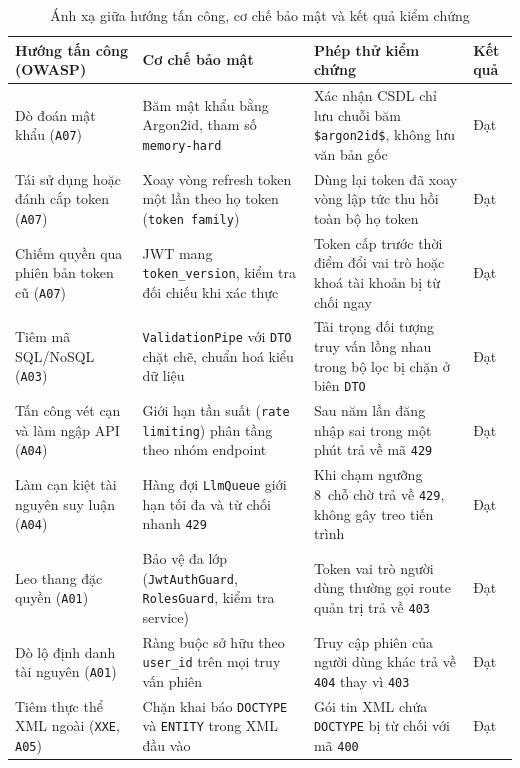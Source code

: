 \begin{table}[htbp]
\centering
\caption{Ánh xạ giữa hướng tấn công, cơ chế bảo mật và kết quả kiểm chứng}
\label{tab:anh-xa-bao-mat-owasp}
\footnotesize
\setlength{\tabcolsep}{4pt}
\begin{tabularx}{\textwidth}{
  >{\raggedright\arraybackslash}p{3.4cm}
  >{\raggedright\arraybackslash}p{4.3cm}
  >{\raggedright\arraybackslash}X
  >{\raggedright\arraybackslash}p{1.4cm}
}
\toprule
\textbf{Hướng tấn công (OWASP)} & \textbf{Cơ chế bảo mật} & \textbf{Phép thử kiểm chứng} & \textbf{Kết quả} \\
\midrule
Dò đoán mật khẩu (\texttt{A07}) & Băm mật khẩu bằng Argon2id, tham số \texttt{memory-hard} & Xác nhận CSDL chỉ lưu chuỗi băm \texttt{\$argon2id\$}, không lưu văn bản gốc & Đạt \\
\midrule
Tái sử dụng hoặc đánh cắp token (\texttt{A07}) & Xoay vòng refresh token một lần theo họ token (\texttt{token family}) & Dùng lại token đã xoay vòng lập tức thu hồi toàn bộ họ token & Đạt \\
\midrule
Chiếm quyền qua phiên bản token cũ (\texttt{A07}) & JWT mang \texttt{token\_version}, kiểm tra đối chiếu khi xác thực & Token cấp trước thời điểm đổi vai trò hoặc khoá tài khoản bị từ chối ngay & Đạt \\
\midrule
Tiêm mã SQL/NoSQL (\texttt{A03}) & \texttt{ValidationPipe} với \texttt{DTO} chặt chẽ, chuẩn hoá kiểu dữ liệu & Tải trọng đối tượng truy vấn lồng nhau trong bộ lọc bị chặn ở biên \texttt{DTO} & Đạt \\
\midrule
Tấn công vét cạn và làm ngập API (\texttt{A04}) & Giới hạn tần suất (\texttt{rate limiting}) phân tầng theo nhóm endpoint & Sau năm lần đăng nhập sai trong một phút trả về mã \texttt{429} & Đạt \\
\midrule
Làm cạn kiệt tài nguyên suy luận (\texttt{A04}) & Hàng đợi \texttt{LlmQueue} giới hạn tối đa và từ chối nhanh \texttt{429} & Khi chạm ngưỡng 8~chỗ chờ trả về \texttt{429}, không gây treo tiến trình & Đạt \\
\midrule
Leo thang đặc quyền (\texttt{A01}) & Bảo vệ đa lớp (\texttt{JwtAuthGuard}, \texttt{RolesGuard}, kiểm tra service) & Token vai trò người dùng thường gọi route quản trị trả về \texttt{403} & Đạt \\
\midrule
Dò lộ định danh tài nguyên (\texttt{A01}) & Ràng buộc sở hữu theo \texttt{user\_id} trên mọi truy vấn phiên & Truy cập phiên của người dùng khác trả về \texttt{404} thay vì \texttt{403} & Đạt \\
\midrule
Tiêm thực thể XML ngoài (\texttt{XXE}, \texttt{A05}) & Chặn khai báo \texttt{DOCTYPE} và \texttt{ENTITY} trong XML đầu vào & Gói tin XML chứa \texttt{DOCTYPE} bị từ chối với mã \texttt{400} & Đạt \\

\end{tabularx}
\end{table}
